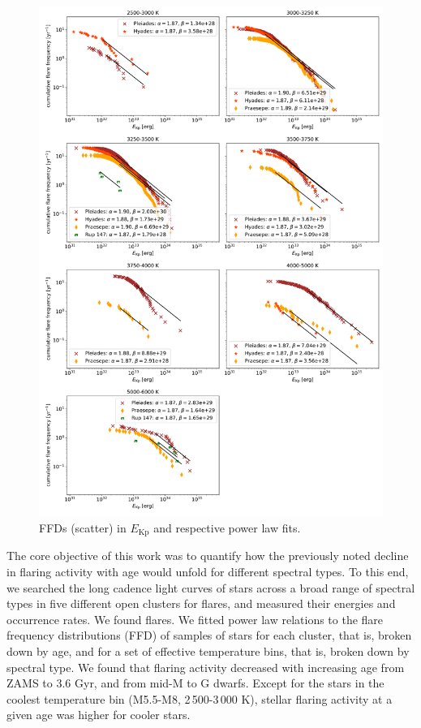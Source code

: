 \documentclass{aa}
\begin{document}
\begin{figure}
    \centering
    \includegraphics[width=16cm]{pics/FFDs/SpT_wise_sample_ffd_energy_wheatland.png}
    \caption{FFDs (scatter) in $E_\mathrm{Kp}$ and respective power law fits.}          	
    \label{fig:powerlawfits_erg}
\end{figure}
The core objective of this work was to quantify how the previously noted decline in flaring activity with age would unfold for different spectral types. To this end, we searched the long cadence light curves of stars across a broad range of spectral types in five different open clusters for flares, and measured their energies and occurrence rates. We found  flares. We fitted power law relations to the flare frequency distributions (FFD) of samples of stars for each cluster, that is, broken down by age, and for a set of effective temperature bins, that is, broken down by spectral type. We found that flaring activity decreased with increasing age from ZAMS to 3.6 Gyr, and from mid-M to G dwarfs. Except for the stars in the coolest temperature bin (M5.5-M8, 2\,500-3\,000 K), stellar flaring activity at a given age was higher for cooler stars.
\end{document}
